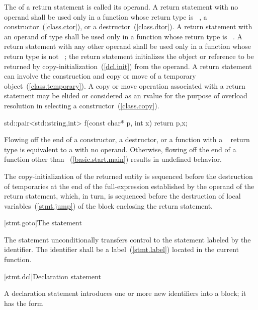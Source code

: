 \pnum
The 
of a return statement is called its operand. A return statement with
no operand shall be used only in a function whose return type is
\cv\ , a constructor~(\ref{class.ctor}), or a
destructor~(\ref{class.dtor}).
%
%
A return statement with an operand of type  shall be used only
in a function whose return type is \cv\ .
A return statement with any other operand shall be used only
in a function whose return type is not \cv\ ;
%
the return statement initializes the object or reference to be returned
by copy-initialization~(\ref{dcl.init}) from the operand.
\enternote
A return statement can involve the
construction and copy or move of a temporary object~(\ref{class.temporary}).
A copy or move operation associated with a return statement may be elided or
considered as an rvalue for the purpose of overload resolution in
selecting a constructor~(\ref{class.copy}).
\exitnote
\enterexample
\begin{codeblock}
std::pair<std::string,int> f(const char* p, int x) {
  return {p,x};
}
\end{codeblock}
\exitexample
Flowing off the end of
a constructor,
a destructor, or
a function with a \cv\  return type is
equivalent to a  with no operand.
Otherwise, flowing off the end of a function
other than ~(\ref{basic.start.main})
results in undefined behavior.

\pnum
The copy-initialization of the returned entity is sequenced before the
destruction of temporaries at the end of the full-expression established
by the operand of the return statement, which, in turn, is sequenced
before the destruction of local variables~(\ref{stmt.jump}) of the block
enclosing the return statement.

[stmt.goto]{The  statement}%

\pnum
The  statement unconditionally transfers control to the
statement labeled by the identifier. The identifier shall be a
%
label~(\ref{stmt.label}) located in the current function.

[stmt.dcl]{Declaration statement}%

\pnum
A declaration statement introduces one or more new identifiers into a
block; it has the form

